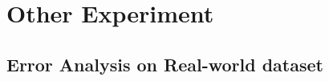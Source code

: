 \section{Other Experiment}
\label{sec:appendix_experiment}

\subsection{Error Analysis on Real-world dataset}
\label{subsec:error_analysis_on_real-world}